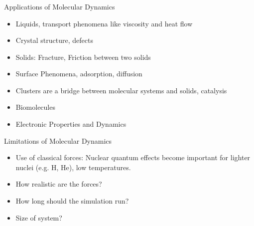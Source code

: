 \documentclass[slidestop,mathserif,compress,xcolor=svgnames]{beamer}
\newenvironment{bblock}[0]
{
\begin{beamerboxesrounded}[upper=uppercol1,lower=lowercol1,shadow=true]}
{\end{beamerboxesrounded}}
\begin{document}
\begin{frame}
  \frametitle{}
  \begin{bblock}{Applications of Molecular Dynamics}
    \begin{itemize}
    \item Liquids, transport phenomena like viscosity and heat flow
    \item Crystal structure, defects 
    \item Solids: Fracture, Friction between two solids
    \item Surface Phenomena, adsorption, diffusion
    \item Clusters are a bridge between molecular systems and solids, catalysis
    \item Biomolecules
    \item Electronic Properties and Dynamics
    \end{itemize}
  \end{bblock}
  \begin{bblock}{Limitations of Molecular Dynamics}
    \begin{itemize}
    \item Use of classical forces: Nuclear quantum effects become important for lighter nuclei (e.g. H, He), low temperatures.
    \item How realistic are the forces?
    \item How long should the simulation run?
    \item Size of system? 
    \end{itemize}
  \end{bblock}
\end{frame}
\end{document}
